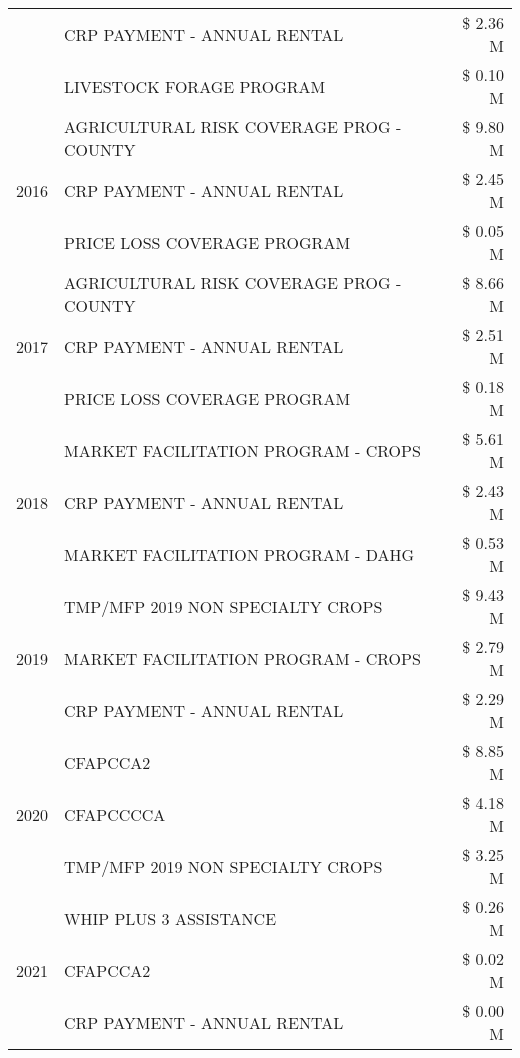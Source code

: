 \begin{tabular}{llr}
 & CRP PAYMENT - ANNUAL RENTAL & \$ 2.36 M \\
 & LIVESTOCK FORAGE PROGRAM & \$ 0.10 M \\
\cline{1-3}
\multirow[t]{3}{*}{2016} & AGRICULTURAL RISK COVERAGE PROG - COUNTY & \$ 9.80 M \\
 & CRP PAYMENT - ANNUAL RENTAL & \$ 2.45 M \\
 & PRICE LOSS COVERAGE PROGRAM & \$ 0.05 M \\
\cline{1-3}
\multirow[t]{3}{*}{2017} & AGRICULTURAL RISK COVERAGE PROG - COUNTY & \$ 8.66 M \\
 & CRP PAYMENT - ANNUAL RENTAL & \$ 2.51 M \\
 & PRICE LOSS COVERAGE PROGRAM & \$ 0.18 M \\
\cline{1-3}
\multirow[t]{3}{*}{2018} & MARKET FACILITATION PROGRAM - CROPS & \$ 5.61 M \\
 & CRP PAYMENT - ANNUAL RENTAL & \$ 2.43 M \\
 & MARKET FACILITATION PROGRAM - DAHG & \$ 0.53 M \\
\cline{1-3}
\multirow[t]{3}{*}{2019} & TMP/MFP 2019 NON SPECIALTY CROPS & \$ 9.43 M \\
 & MARKET FACILITATION PROGRAM - CROPS & \$ 2.79 M \\
 & CRP PAYMENT - ANNUAL RENTAL & \$ 2.29 M \\
\cline{1-3}
\multirow[t]{3}{*}{2020} & CFAPCCA2 & \$ 8.85 M \\
 & CFAPCCCCA & \$ 4.18 M \\
 & TMP/MFP 2019 NON SPECIALTY CROPS & \$ 3.25 M \\
\cline{1-3}
\multirow[t]{3}{*}{2021} & WHIP PLUS 3 ASSISTANCE & \$ 0.26 M \\
 & CFAPCCA2 & \$ 0.02 M \\
 & CRP PAYMENT - ANNUAL RENTAL & \$ 0.00 M \\
\cline{1-3}
\bottomrule
\end{tabular}

